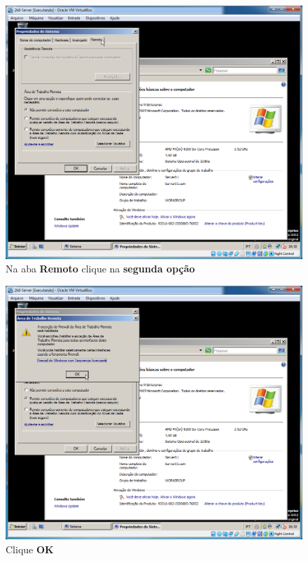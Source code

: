 \documentclass[10pt]{article}
\begin{document}
\begin{figure}[H]
    \centering
    \caption{Na aba \textbf{Remoto} clique na \textbf{segunda opção}}
    \label{fig:ar013}
    \includegraphics[width=\linewidth]{images/acesso_remoto/ar013.png}
\end{figure}
\begin{figure}[H]
    \centering
    \caption{Clique \textbf{OK}}
    \label{fig:ar014}
    \includegraphics[width=\linewidth]{images/acesso_remoto/ar014.png}
\end{figure}
\end{document}
